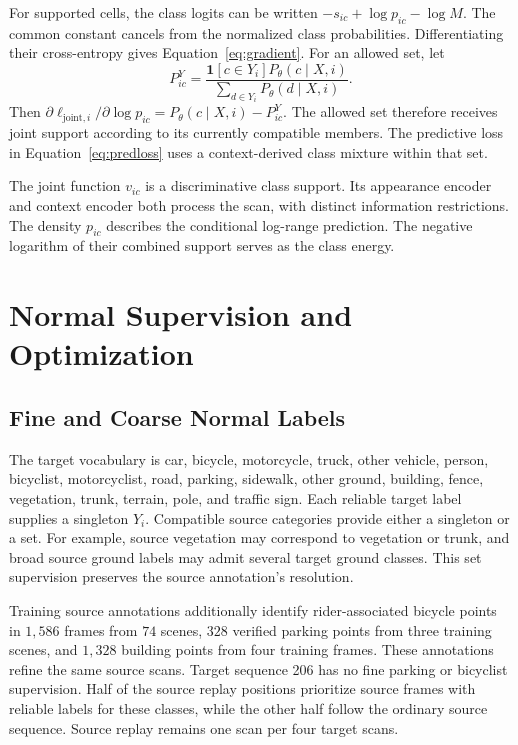 \documentclass{article}
\begin{document}
For supported cells, the class logits can be written $-s_{ic}+\log p_{ic}-\log M$. The common constant cancels from the normalized class probabilities. Differentiating their cross-entropy gives Equation~\eqref{eq:gradient}. For an allowed set, let
\begin{equation}
 P^Y_{ic}=\frac{\mathbf1[c\in Y_i]P_\theta(c\mid X,i)}
 {\sum_{d\in Y_i}P_\theta(d\mid X,i)}.
\end{equation}
Then $\partial\ell_{\mathrm{joint},i}/\partial\log p_{ic}=P_\theta(c\mid X,i)-P^Y_{ic}$. The allowed set therefore receives joint support according to its currently compatible members. The predictive loss in Equation~\eqref{eq:predloss} uses a context-derived class mixture within that set.

The joint function $v_{ic}$ is a discriminative class support. Its appearance encoder and context encoder both process the scan, with distinct information restrictions. The density $p_{ic}$ describes the conditional log-range prediction. The negative logarithm of their combined support serves as the class energy.

\section{Normal Supervision and Optimization}
\label{app:training}
\subsection{Fine and Coarse Normal Labels}
The target vocabulary is car, bicycle, motorcycle, truck, other vehicle, person, bicyclist, motorcyclist, road, parking, sidewalk, other ground, building, fence, vegetation, trunk, terrain, pole, and traffic sign. Each reliable target label supplies a singleton $Y_i$. Compatible source categories provide either a singleton or a set. For example, source vegetation may correspond to vegetation or trunk, and broad source ground labels may admit several target ground classes. This set supervision preserves the source annotation's resolution.

Training source annotations additionally identify rider-associated bicycle points in $1{,}586$ frames from $74$ scenes, $328$ verified parking points from three training scenes, and $1{,}328$ building points from four training frames. These annotations refine the same source scans. Target sequence 206 has no fine parking or bicyclist supervision. Half of the source replay positions prioritize source frames with reliable labels for these classes, while the other half follow the ordinary source sequence. Source replay remains one scan per four target scans.
\end{document}
